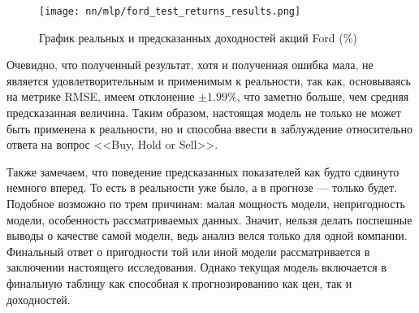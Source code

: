 \begin{figure}[H]
	\centering
	\texttt{[image: nn/mlp/ford\_test\_returns\_results.png]}
	\caption{График реальных и предсказанных доходностей акций Ford (\%)}
	\label{fig::ford_test_returns_results}
\end{figure}
Очевидно, что полученный результат, хотя и полученная ошибка мала, не является удовлетворительным и применимым к реальности, так как, основываясь на метрике RMSE, имеем отклонение $\pm 1.99\%$, что заметно больше, чем средняя предсказанная величина. Таким образом, настоящая модель не только не может быть применена к реальности, но и способна ввести в заблуждение относительно ответа на вопрос <<Buy, Hold or Sell>>. 

Также замечаем, что поведение предсказанных показателей как будто сдвинуто немного вперед. То есть в реальности уже было, а в прогнозе --- только будет. Подобное возможно по трем причинам: малая мощность модели, непригодность модели, особенность рассматриваемых данных. Значит, нельзя делать поспешные выводы о качестве самой модели, ведь анализ велся только для одной компании. Финальный ответ о пригодности той или иной модели рассматривается в заключении настоящего исследования. Однако текущая модель включается в финальную таблицу как способная к прогнозированию как цен, так и доходностей.